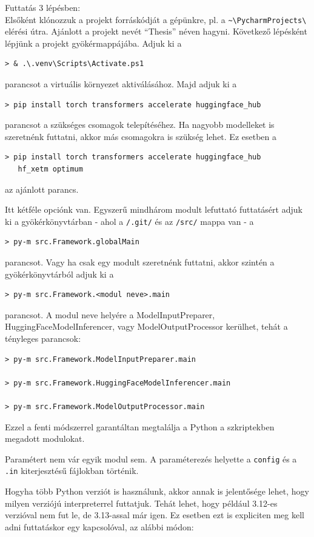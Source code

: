 \documentclass[12pt]{report}
\begin{document}
    Futtatás 3 lépésben:\\
    Elsőként klónozzuk a projekt forráskódját a gépünkre, pl. a \verb|~\PycharmProjects\| elérési útra. Ajánlott a projekt nevét ``Thesis'' néven hagyni.
    Következő lépésként lépjünk a projekt gyökérmappájába. Adjuk ki a \begin{lstlisting}
> & .\.venv\Scripts\Activate.ps1
    \end{lstlisting} parancsot a virtuális környezet aktiválásához. Majd adjuk ki a \begin{lstlisting}
> pip install torch transformers accelerate huggingface_hub
    \end{lstlisting} parancsot a szükséges csomagok telepítéséhez. Ha nagyobb modelleket is szeretnénk futtatni, akkor más csomagokra is szükség lehet. Ez esetben a 
    \begin{lstlisting}
> pip install torch transformers accelerate huggingface_hub
   hf_xetm optimum
    \end{lstlisting} az ajánlott parancs.

    Itt kétféle opciónk van. Egyszerű mindhárom modult lefuttató futtatásért adjuk ki a gyökérkönyvtárban - ahol a \texttt{\allowbreak /.git/} és az \texttt{\allowbreak /src/} mappa van - a
    \begin{lstlisting}
> py-m src.Framework.globalMain
    \end{lstlisting} parancsot. Vagy ha csak egy modult szeretnénk futtatni, akkor szintén a gyökérkönyvtárból adjuk ki a \begin{lstlisting}
> py-m src.Framework.<modul neve>.main
    \end{lstlisting}
    parancsot. A modul neve helyére a ModelInputPreparer, HuggingFaceModelInferencer, vagy ModelOutputProcessor kerülhet, tehát a tényleges parancsok:
    \begin{lstlisting}
> py-m src.Framework.ModelInputPreparer.main

> py-m src.Framework.HuggingFaceModelInferencer.main

> py-m src.Framework.ModelOutputProcessor.main

    \end{lstlisting}
    Ezzel a fenti módszerrel garantáltan megtalálja a Python a szkriptekben megadott modulokat.

    Paramétert nem vár egyik modul sem.
    A paraméterezés helyette a \texttt{\allowbreak config} és a \texttt{\allowbreak .in} kiterjesztésű fájlokban történik.

    Hogyha több Python verziót is használunk, akkor annak is jelentősége lehet, hogy milyen verziójú interpreterrel futtatjuk. Tehát lehet, hogy például 3.12-es verzióval nem fut le, de 3.13-assal már igen. Ez esetben ezt is expliciten meg kell adni futtatáskor egy kapcsolóval, az alábbi módon:
\end{document}
